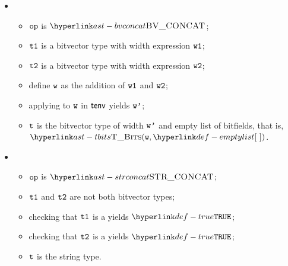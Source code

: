 \begin{itemize}
  \item {}
  \begin{itemize}
    \item $\texttt{op}$ is $\BVCONCAT$;
    \item $\texttt{t1}$ is a bitvector type with width expression $\texttt{w1}$;
    \item $\texttt{t2}$ is a bitvector type with width expression $\texttt{w2}$;
    \item define $\texttt{w}$ as the addition of $\texttt{w1}$ and $\texttt{w2}$;
    \item applying \normalize{} to $\texttt{w}$ in $\textsf{tenv}$ yields $\texttt{w'}$;
    \item $\texttt{t}$ is the bitvector type of width $\texttt{w'}$ and empty list of bitfields, that is, \\ $\TBits(\vw, \emptylist)$.
  \end{itemize}

  \item {}
  \begin{itemize}
    \item $\texttt{op}$ is $\STRCONCAT$;
    \item $\texttt{t1}$ and $\texttt{t2}$ are not both bitvector types;
    \item checking that $\texttt{t1}$ is a \Prosesingulartype{} yields $\True$\ProseOrTypeError;
    \item checking that $\texttt{t2}$ is a \Prosesingulartype{} yields $\True$\ProseOrTypeError;
    \item $\texttt{t}$ is the string type.
  \end{itemize}


\end{itemize}
